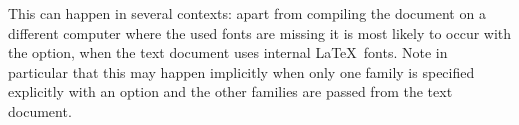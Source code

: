\documentclass{lyluatexexample}
\begin{document}
\bigskip
{}

This can happen in several contexts: apart from compiling the document on a
different computer where the used fonts are missing it is most likely to occur
with the  option, when the text document uses internal
\LaTeX\ fonts. Note in particular that this may happen implicitly when only one
family is specified explicitly with an option and the other families are passed
from the text document.
\end{document}
